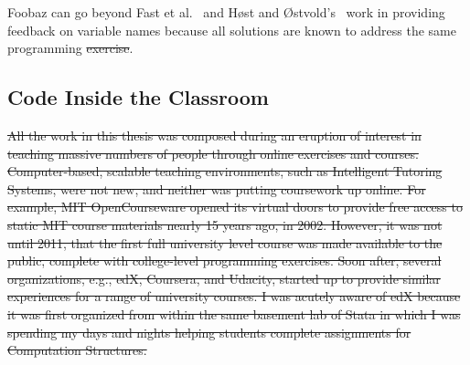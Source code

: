 \documentclass[12pt,twoside]{mitthesis}
\providecommand{\DIFaddtex}[1]{{\protect\color{blue}\uwave{#1}}} %
\providecommand{\DIFdeltex}[1]{{\protect\color{red}\sout{#1}}}                      %
\providecommand{\DIFaddbegin}{} %
\providecommand{\DIFaddend}{} %
\providecommand{\DIFdelbegin}{} %
\providecommand{\DIFdelend}{} %
\providecommand{\DIFadd}[1]{\texorpdfstring{\DIFaddtex{#1}}{#1}} %
\providecommand{\DIFdel}[1]{\texorpdfstring{\DIFdeltex{#1}}{}} %
\begin{document}
{{{{{{{{{{Foobaz can go beyond Fast et al.~\cite{codex} and H{{\o{}}}st and {{\O{}}}stvold's~\cite{host2008java,host2009debugging} work in providing feedback on variable names because all solutions are known to address the same programming \DIFdelbegin \DIFdel{exercise}\DIFdelend \DIFaddbegin \DIFadd{problem}\DIFaddend .

\DIFdelbegin %
\DIFdelend %
\DIFaddbegin \subsection{Code Inside the Classroom}
\DIFaddend 

\DIFdelbegin \DIFdel{All the work in this thesis was composed during an eruption of interest in teaching massive numbers of people through online exercises and courses. Computer-based, scalable teaching environments, such as Intelligent Tutoring Systems, were not new, and neither was putting coursework up online. For example, MIT OpenCourseware opened its virtual doors to provide free access to static MIT course materials nearly 15 years ago, in 2002. However, it was not until 2011, that the first full university level course was made available to the public, complete with college-level programming exercises. Soon after, several organizations, e.g., edX, Coursera, and Udacity, started up to provide similar experiences for a range of university courses. I was acutely aware of edX because it was first organized from within the same basement lab of Stata in which I was spending my days and nights helping students complete assignments for Computation Structures.
}%


}}}}}}}}}}
\end{document}
